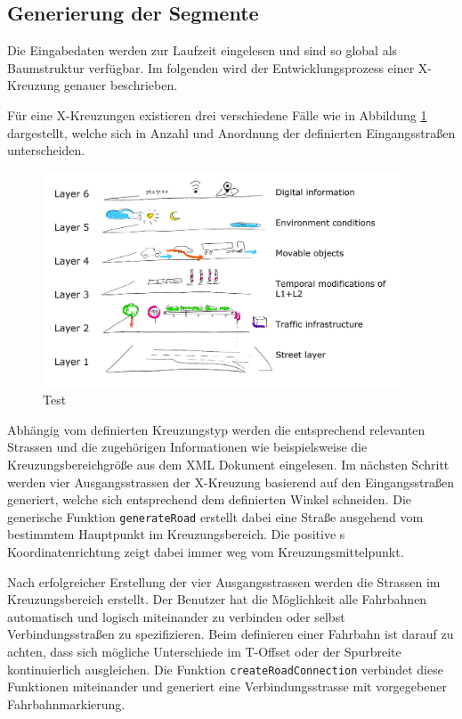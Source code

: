 \subsection{Generierung der Segmente}
Die Eingabedaten werden zur Laufzeit eingelesen und sind so global als Baumstruktur verfügbar. Im folgenden wird der Entwicklungsprozess einer X-Kreuzung genauer beschrieben. 

Für eine X-Kreuzungen existieren drei verschiedene Fälle wie in Abbildung \ref{abb4} dargestellt, welche sich in Anzahl und Anordnung der definierten Eingangsstraßen unterscheiden.

\begin{figure}[H]
	\flushleft
	\includegraphics[width=0.95\textwidth]{fig/fig1.png}
	\caption{Test}
	\label{abb4}
\end{figure}

Abhängig vom definierten Kreuzungstyp werden die entsprechend relevanten Strassen und die zugehörigen Informationen wie beispielsweise die Kreuzungsbereichgröße aus dem XML Dokument eingelesen. Im nächsten Schritt werden vier Ausgangsstrassen der X-Kreuzung basierend auf den Eingangsstraßen generiert, welche sich entsprechend dem definierten Winkel schneiden. Die generische Funktion \texttt{generateRoad} erstellt dabei eine Straße ausgehend vom bestimmtem Hauptpunkt im Kreuzungsbereich. Die positive s Koordinatenrichtung zeigt dabei immer weg vom Kreuzungsmittelpunkt. 

Nach erfolgreicher Erstellung der vier Ausgangsstrassen werden die Strassen im Kreuzungsbereich erstellt. Der Benutzer hat die Möglichkeit alle Fahrbahnen automatisch und logisch miteinander zu verbinden oder selbst Verbindungsstraßen zu spezifizieren. Beim definieren einer Fahrbahn ist darauf zu achten, dass sich mögliche Unterschiede im T-Offset oder der Spurbreite kontinuierlich ausgleichen. Die Funktion \texttt{createRoadConnection} verbindet diese Funktionen miteinander und generiert eine Verbindungsstrasse mit vorgegebener Fahrbahnmarkierung. 

